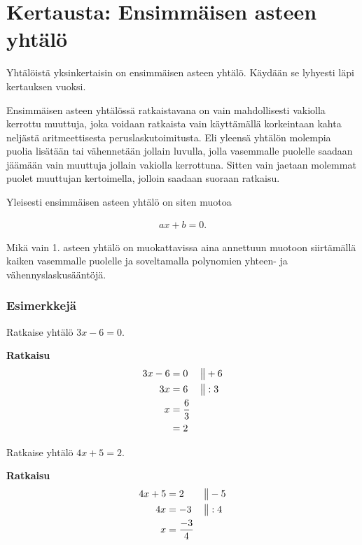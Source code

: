 \section{Kertausta: Ensimmäisen asteen yhtälö}

Yhtälöistä yksinkertaisin on ensimmäisen asteen yhtälö. Käydään se lyhyesti
läpi kertauksen vuoksi.

Ensimmäisen asteen yhtälössä ratkaistavana on vain mahdollisesti vakiolla
kerrottu muuttuja, joka voidaan ratkaista vain käyttämällä korkeintaan
kahta neljästä aritmeettisesta peruslaskutoimitusta. Eli yleensä
yhtälön molempia puolia lisätään tai vähennetään jollain luvulla, jolla
vasemmalle puolelle saadaan jäämään vain muuttuja jollain vakiolla kerrottuna.
Sitten vain jaetaan molemmat puolet muuttujan kertoimella, jolloin saadaan
suoraan ratkaisu.


Yleisesti ensimmäisen asteen yhtälö on siten muotoa

\begin{align*}
    ax + b = 0.
\end{align*}

Mikä vain 1. asteen yhtälö on muokattavissa aina annettuun
muotoon siirtämällä kaiken vasemmalle puolelle ja
soveltamalla polynomien yhteen- ja vähennyslaskusääntöjä.

\subsubsection*{Esimerkkejä}

\begin{esimerkki}
Ratkaise yhtälö $3x - 6 = 0$.

\textbf{Ratkaisu}
  \begin{align*}
    3x - 6 &= 0 & \big\| & +6 \\
        3x &= 6 & \big\| & :3 \\
         x &= \frac{6}{3} \\
           &= 2
  \end{align*}
\end{esimerkki}

\begin{esimerkki}
Ratkaise yhtälö $4x + 5 = 2$.

\textbf{Ratkaisu}
\begin{align*}
    4x + 5 &= 2  & \big\| & -5 \\
        4x &= -3 & \big\| & :4 \\
         x &= \frac{-3}{4}
 \end{align*}
\end{esimerkki}

